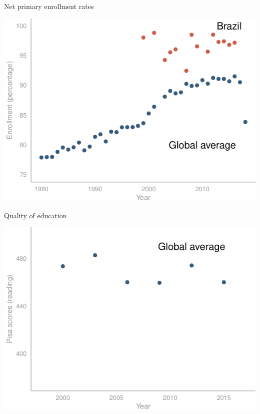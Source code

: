 \documentclass[
  ignorenonframetext,
]{beamer}
\begin{document}
\begin{frame}{Net primary enrollment rates}
\protect\hypertarget{net-primary-enrollment-rates-1}{}

\begin{center}\includegraphics{presentation_plas_11-14-19_files/figure-beamer/unnamed-chunk-3-1} \end{center}

\end{frame}

\begin{frame}{Quality of education}
\protect\hypertarget{quality-of-education}{}

\begin{center}\includegraphics{presentation_plas_11-14-19_files/figure-beamer/unnamed-chunk-4-1} \end{center}

\end{frame}
\end{document}
